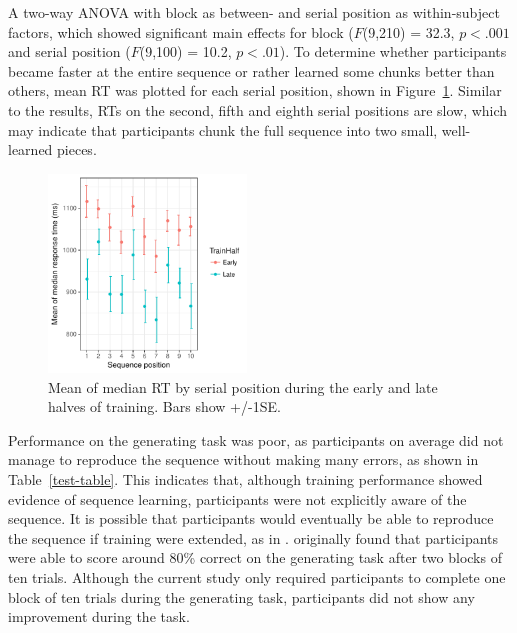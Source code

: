 \documentclass[man,floatsintext]{apa6}
\begin{document}
A two-way ANOVA with block as between- and serial position as within-subject factors, which showed significant main effects for block ($F$(9,210) = 32.3, $p<.001$ and serial position ($F$(9,100) = 10.2, $p<.01$). To determine whether participants became faster at the entire sequence or rather learned some chunks better than others, mean RT was plotted for each serial position, shown in Figure~\ref{fig:Seqpos}. Similar to the  results, RTs on the second, fifth and eighth serial positions are slow, which may indicate that participants chunk the full sequence into two small, well-learned pieces.

\begin{figure}[!h]
  \centering
  \includegraphics[width=0.47\textwidth]{figures/exp1_RT_by_sequence_position}
  \caption{Mean of median RT by serial position during the early and late halves of training. Bars show +/-1SE.}
  \label{fig:Seqpos}
\end{figure} 

Performance on the generating task was poor, as participants on average did not manage to reproduce the sequence without making many errors, as shown in Table~\ref{test-table}. This indicates that, although training performance showed evidence of sequence learning, participants were not explicitly aware of the sequence. It is possible that participants would eventually be able to reproduce the sequence if training were extended, as in .  originally found that participants were able to score around 80\% correct on the generating task after two blocks of ten trials. Although the current study only required participants to complete one block of ten trials during the generating task, participants did not show any improvement during the task. 
\end{document}
